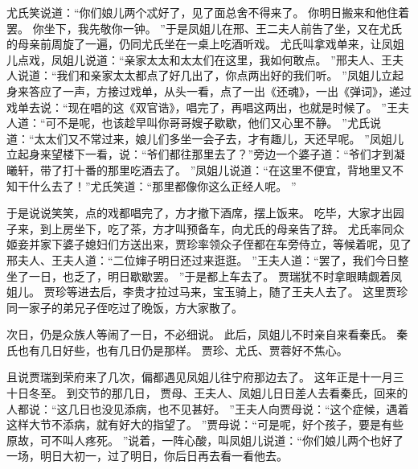 尤氏笑说道：“你们娘儿两个忒好了，见了面总舍不得来了。
你明日搬来和他住着罢。
你坐下，我先敬你一钟。
”于是凤姐儿在邢、王二夫人前告了坐，又在尤氏的母亲前周旋了一遍，仍同尤氏坐在一桌上吃酒听戏。
尤氏叫拿戏单来，让凤姐儿点戏，凤姐儿说道：“亲家太太和太太们在这里，我如何敢点。
”邢夫人、王夫人说道：“我们和亲家太太都点了好几出了，你点两出好的我们听。
”凤姐儿立起身来答应了一声，方接过戏单，从头一看，点了一出《还魂》，一出《弹词》，递过戏单去说：“现在唱的这《双官诰》，唱完了，再唱这两出，也就是时候了。
”王夫人道：“可不是呢，也该趁早叫你哥哥嫂子歇歇，他们又心里不静。
”尤氏说道：“太太们又不常过来，娘儿们多坐一会子去，才有趣儿，天还早呢。
”凤姐儿立起身来望楼下一看，说：“爷们都往那里去了？”旁边一个婆子道：“爷们才到凝曦轩，带了打十番的那里吃酒去了。
”凤姐儿说道：“在这里不便宜，背地里又不知干什么去了！”尤氏笑道：“那里都像你这么正经人呢。
”\par
于是说说笑笑，点的戏都唱完了，方才撤下酒席，摆上饭来。
吃毕，大家才出园子来，到上房坐下，吃了茶，方才叫预备车，向尤氏的母亲告了辞。
尤氏率同众姬妾并家下婆子媳妇们方送出来，贾珍率领众子侄都在车旁侍立，等候着呢，见了邢夫人、王夫人道：“二位婶子明日还过来逛逛。
”王夫人道：“罢了，我们今日整坐了一日，也乏了，明日歇歇罢。
”于是都上车去了。
贾瑞犹不时拿眼睛觑着凤姐儿。
贾珍等进去后，李贵才拉过马来，宝玉骑上，随了王夫人去了。
这里贾珍同一家子的弟兄子侄吃过了晚饭，方大家散了。
\par
次日，仍是众族人等闹了一日，不必细说。
此后，凤姐儿不时亲自来看秦氏。
秦氏也有几日好些，也有几日仍是那样。
贾珍、尤氏、贾蓉好不焦心。
\par
且说贾瑞到荣府来了几次，偏都遇见凤姐儿往宁府那边去了。
这年正是十一月三十日冬至。
到交节的那几日，
贾母、王夫人、凤姐儿日日差人去看秦氏，回来的人都说：“这几日也没见添病，也不见甚好。
”王夫人向贾母说：“这个症候，遇着这样大节不添病，就有好大的指望了。
”贾母说：“可是呢，好个孩子，要是有些原故，可不叫人疼死。
”说着，一阵心酸，叫凤姐儿说道：“你们娘儿两个也好了一场，明日大初一，过了明日，你后日再去看一看他去。
